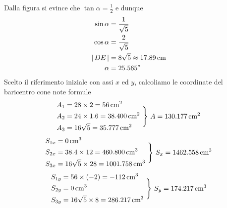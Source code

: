 \noindent Dalla figura si evince che $\tan\alpha=\frac{1}{2}$ e dunque 
\begin{align*}
\sin\alpha &= \frac{1}{\sqrt{5}} \\
\cos\alpha &= \frac{2}{\sqrt{5}} \\
\lvert\, DE\,\lvert &= 8\sqrt{5} \approx 17.89\,\textup{cm} \\ 
\alpha &= 25.565^{\circ}
\end{align*}
Scelto il riferimento iniziale con assi $x$ ed $y$, calcoliamo le coordinate del baricentro cone note formule
\begin{equation*}
\begin{aligned}
A_1 &=28\times2 = 56\,\textup{cm}^2 \\
A_2 &=24\times1.6 = 38.400\,\textup{cm}^2 \\
A_3 &=16\sqrt{5} = 35.777\,\textup{cm}^2
\end{aligned}
\,\,\Biggr\}\,\, A = 130.177\,\textup{cm}^2
\end{equation*}
\begin{equation*}
\begin{aligned}
S_{1x} &= 0\,\textup{cm}^3 \\
S_{2x} &= 38.4\times12 = 460.800\,\textup{cm}^3 \\
S_{3x} &= 16\sqrt{5}\times 28  = 1001.758\,\textup{cm}^3
\end{aligned}
\,\,\Biggr\}\,\, S_x = 1462.558\,\textup{cm}^3
\end{equation*}
\begin{equation*}
\begin{aligned}
S_{1y} &= 56\times(-2) = -112\,\textup{cm}^3 \\
S_{2y} &= 0\,\textup{cm}^3 \\
S_{3y} &= 16\sqrt{5}\times 8  = 286.217\,\textup{cm}^3
\end{aligned}
\,\,\Biggr\}\,\, S_y = 174.217\,\textup{cm}^3
\end{equation*}
